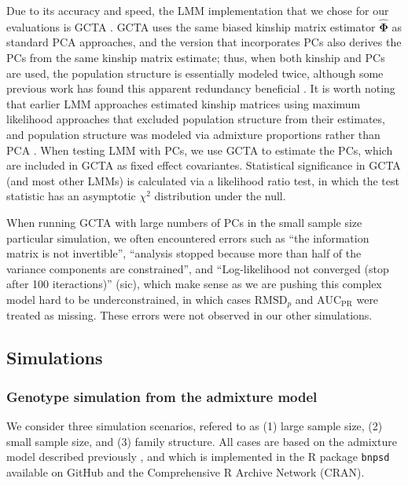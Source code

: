 \documentclass[11pt]{article}
\newcommand{\rmsd}{\text{RMSD}_p}
\newcommand{\auc}{\text{AUC}_\text{PR}}
\begin{document}
Due to its accuracy and speed, the LMM implementation that we chose for our evaluations is GCTA \citep{yang_gcta:_2011}.
GCTA uses the same biased kinship matrix estimator $\mathbf{\hat{\Phi}}$ as standard PCA approaches, and the version that incorporates PCs also derives the PCs from the same kinship matrix estimate; thus, when both kinship and PCs are used, the population structure is essentially modeled twice, although some previous work has found this apparent redundancy beneficial \citep{zhao_arabidopsis_2007, price_new_2010}.
It is worth noting that earlier LMM approaches estimated kinship matrices using maximum likelihood approaches that excluded population structure from their estimates, and population structure was modeled via admixture proportions rather than PCA \citep{yu_unified_2006, zhao_arabidopsis_2007}.
When testing LMM with PCs, we use GCTA to estimate the PCs, which are included in GCTA as fixed effect covariantes.
Statistical significance in GCTA (and most other LMMs) is calculated via a likelihood ratio test, in which the test statistic has an asymptotic $\chi^2$ distribution under the null.

When running GCTA with large numbers of PCs in the small sample size particular simulation, we often encountered errors such as ``the information matrix is not invertible'', ``analysis stopped because more than half of the variance components are constrained'', and ``Log-likelihood not converged (stop after 100 iteractions)'' (sic), which make sense as we are pushing this complex model hard to be underconstrained, in which cases $\rmsd$ and $\auc$ were treated as missing.
These errors were not observed in our other simulations.


\subsection{Simulations}

\subsubsection{Genotype simulation from the admixture model}

We consider three simulation scenarios, refered to as (1) large sample size, (2) small sample size, and (3) family structure.
All cases are based on the admixture model described previously \citep{ochoa_fst1, ochoa_fst2}, and which is implemented in the R package \texttt{bnpsd} available on GitHub and the Comprehensive R Archive Network (CRAN).
\end{document}

